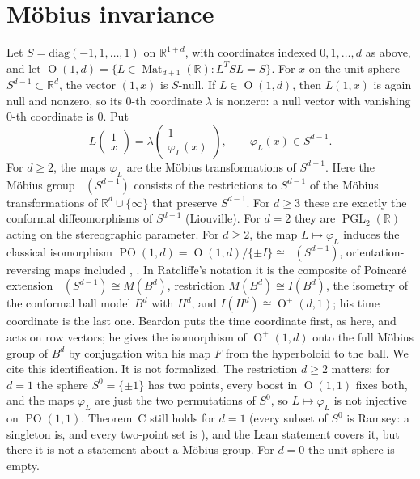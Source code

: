 \documentclass[11pt]{amsart}
\newcommand{\R}{\mathbb{R}}
\DeclareMathOperator{\PO}{PO}
\DeclareMathOperator{\Ort}{O}
\DeclareMathOperator{\PGL}{PGL}
\DeclareMathOperator{\Mob}{M\ddot{o}b}
\DeclareMathOperator{\Mat}{Mat}
\theoremstyle{plain}
\theoremstyle{definition}
\begin{document}
\section{M\"obius invariance}\label{sec:mobius}

Let $S=\mathrm{diag}(-1,1,\dots,1)$ on $\R^{1+d}$, with coordinates indexed $0,1,\dots,d$ as above,
and let $\Ort(1,d)=\{L\in\Mat_{d+1}(\R):L^TSL=S\}$. For $x$ on the unit sphere
$S^{d-1}\subset\R^d$, the vector $(1,x)$ is $S$-null. If $L\in\Ort(1,d)$, then $L(1,x)$ is again
null and nonzero, so its $0$-th coordinate $\lambda$ is nonzero: a null vector with vanishing
$0$-th coordinate is $0$. Put
\[
 L\begin{pmatrix}1\\x\end{pmatrix}=\lambda\begin{pmatrix}1\\\varphi_L(x)\end{pmatrix},
 \qquad \varphi_L(x)\in S^{d-1}.
\]
For $d\ge2$, the maps $\varphi_L$ are the M\"obius transformations of $S^{d-1}$. Here the M\"obius
group $\Mob(S^{d-1})$ consists of the restrictions to $S^{d-1}$ of the M\"obius transformations of
$\R^d\cup\{\infty\}$ that preserve $S^{d-1}$. For $d\ge3$ these are exactly the conformal
diffeomorphisms of $S^{d-1}$ (Liouville). For $d=2$ they are $\PGL_2(\R)$ acting on the
stereographic parameter. For $d\ge2$, the map $L\mapsto\varphi_L$ induces the classical isomorphism
$\PO(1,d)=\Ort(1,d)/\{\pm I\}\cong\Mob(S^{d-1})$, orientation-reversing maps included
\cite[Thm.~3.2.3 and \S3.2, Cor.~3; \S4.4, Cor.~3; Thm.~4.5.2 and \S4.5, Cor.~1]{Ratcliffe},
\cite[\S3.7, Thms.~3.7.5 and 3.7.6, pp.~49--54]{Beardon}. In Ratcliffe's notation it is the
composite of Poincar\'e extension $\Mob(S^{d-1})\cong M(B^d)$, restriction $M(B^d)\cong I(B^d)$,
the isometry of the conformal ball model $B^d$ with $H^d$, and $I(H^d)\cong\Ort^+(d,1)$; his time
coordinate is the last one. Beardon puts the time coordinate first,
as here, and acts on row vectors; he gives the isomorphism of $\Ort^+(1,d)$ onto the full M\"obius
group of $B^d$ by conjugation with his map $F$ from the hyperboloid to the ball.
We cite this identification. It is not formalized.
The restriction $d\ge2$ matters: for $d=1$ the sphere $S^0=\{\pm1\}$ has two points, every boost
in $\Ort(1,1)$ fixes both, and the maps $\varphi_L$ are just the two permutations of $S^0$, so
$L\mapsto\varphi_L$ is not injective on $\PO(1,1)$. Theorem~C still holds for $d=1$ (every
subset of $S^0$ is Ramsey: a singleton is, and every two-point set is \cite[Cor.~7.4]{OAI172}),
and the Lean statement covers it, but there it is not a statement about a M\"obius group. For
$d=0$ the unit sphere is empty.
\end{document}
